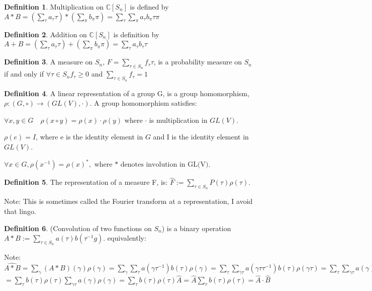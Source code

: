 \documentclass{article}
\theoremstyle{definition}
\newtheorem{definition}{Definition}
\begin{document}
\begin{definition} Multiplication on $\mathbb{C}[S_n]$ is defined by $A*B = (\sum_{\tau} a_\tau \tau)*(\sum_{\pi} b_\pi \pi) = \sum_{\tau} \sum_{\pi} a_\tau b_\pi \tau \pi $ \end{definition}
\begin{definition} Addition on $\mathbb{C}[S_n]$ is definition by $A+B = (\sum_{\tau} a_\tau \tau) + (\sum_\pi b_\pi \pi) = \sum_\tau a_\tau b_\tau \tau$ \end{definition}
\begin{definition} A measure on $S_n$, $F = \sum_{\tau \in S_n} f_\tau \tau $, is a probability measure on $S_n$ if and only if $\forall \tau \in S_n f_\tau \geq 0 $ and $\sum_{\tau \in S_n} f_\tau = 1 $
\end{definition}

\begin{definition} A linear representation of a group G, is a group homomorphism, $\rho : (G,\circ) \rightarrow (GL(V),\cdot)$. A group homomorphism satisfies:
\item \(\forall x,y \in G \quad \rho(x\circ y) = \rho(x) \cdot \rho(y) \) where $\cdot $ is multiplication in $GL(V)$.
\item \( \rho(e) = I \), where e is the identity element in $G$ and I is the identity element in $ GL(V) $.
\item \( \forall x \in G, \rho(x^{-1}) = \rho(x)^*, \text{ where * denotes involution in GL(V)} \).
\end{definition}

\begin{definition}The representation of a measure F, is: $ \hat{F} := \sum_{\tau \in S_n} P(\tau) \rho(\tau) $. \end{definition}
Note: This is sometimes called the Fourier transform at a representation, I avoid that lingo. 

\begin{definition}(Convolution of two functions on $S_n$) is a binary operation $ A * B := \sum_{\tau \in S_n} a(\tau) b(\tau^{-1}g) $. equivalently:
\end{definition}

Note: $ \widehat{A*B} = \sum_{\gamma} (A*B)(\gamma)\rho(\gamma) 
= \sum_{\gamma } \sum_{\tau} a(\gamma \tau^{-1})b(\tau)\rho(\gamma )
= \sum_{\tau} \sum_{\gamma\tau } a(\gamma\tau \tau^{-1})b(\tau)\rho(\gamma\tau )
= \sum_{\tau} \sum_{\gamma\tau } a(\gamma )b(\tau)\rho(\gamma)\rho(\tau ) $
$ = \sum_{\tau} b(\tau)\rho(\tau ) \sum_{\gamma\tau } a(\gamma )\rho(\gamma) 
= \sum_{\tau} b(\tau)\rho(\tau ) \hat{A}
= \hat{A} \sum_{\tau} b(\tau)\rho(\tau )
= \hat{A} \cdot \hat{B} $
\end{document}
